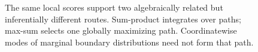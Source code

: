 \begin{figure}[!htbp]
  \centering
  \resizebox{0.91\textwidth}{!}{}
  \caption{The same local scores support two algebraically related but inferentially different routes. Sum-product integrates over paths; max-sum selects one globally maximizing path. Coordinatewise modes of marginal boundary distributions need not form that path.}
  \label{fig:semiring-routes}
\end{figure}
